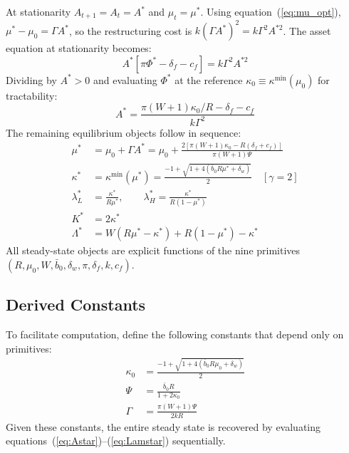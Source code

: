 \documentclass[12pt,a4paper]{article}
\begin{document}
At stationarity $A_{t+1} = A_t = A^*$ and $\mu_t = \mu^*$.
Using equation~(\ref{eq:mu_opt}), $\mu^* - \mu_0 = \Gamma A^*$,
so the restructuring cost is $k(\Gamma A^*)^2 = k\Gamma^2 A^{*2}$.
The asset equation at stationarity becomes:
\begin{equation}
  A^*\left[\pi\Phi^* - \delta_f - c_f\right] = k\Gamma^2 A^{*2}
\end{equation}
Dividing by $A^* > 0$ and evaluating $\Phi^*$ at the reference
$\kappa_0 \equiv \kappa^{\min}(\mu_0)$ for tractability:
\begin{equation}
  \boxed{A^* = \frac{\pi(W+1)\kappa_0/R - \delta_f - c_f}{k\Gamma^2}}
  \label{eq:Astar}
\end{equation}
The remaining equilibrium objects follow in sequence:
\begin{align}
  \mu^* &= \mu_0 + \Gamma A^*
  = \mu_0 + \frac{2\left[\pi(W+1)\kappa_0 - R(\delta_f+c_f)\right]}{\pi(W+1)\Psi}
  \label{eq:mustar} \\[4pt]
  \kappa^* &= \kappa^{\min}(\mu^*)
  = \frac{-1+\sqrt{1+4(\bar{b}_0 R\mu^*+\delta_w)}}{2} \quad [\gamma=2]
  \label{eq:kstar} \\[4pt]
  \lambda_L^* &= \frac{\kappa^*}{R\mu^*},
  \qquad
  \lambda_H^* = \frac{\kappa^*}{R(1-\mu^*)}
  \label{eq:lambdastar_ss} \\[4pt]
  K^* &= 2\kappa^*
  \label{eq:Kstar} \\[4pt]
  \Lambda^* &= W(R\mu^*-\kappa^*) + R(1-\mu^*)-\kappa^*
  \label{eq:Lamstar}
\end{align}
All steady-state objects are explicit functions of the nine primitives
$(R, \mu_0, W, \bar{b}_0, \delta_w, \pi, \delta_f, k, c_f)$.

\subsection{Derived Constants}

To facilitate computation, define the following constants that depend only on primitives:
\begin{align}
  \kappa_0 &= \frac{-1+\sqrt{1+4(\bar{b}_0 R\mu_0+\delta_w)}}{2} \label{eq:k0}\\
  \Psi &= \frac{\bar{b}_0 R}{1+2\kappa_0} \label{eq:Psi} \\
  \Gamma &= \frac{\pi(W+1)\Psi}{2kR} \label{eq:Gamma}
\end{align}
Given these constants, the entire steady state is recovered by
evaluating equations~(\ref{eq:Astar})--(\ref{eq:Lamstar}) sequentially.
\end{document}
